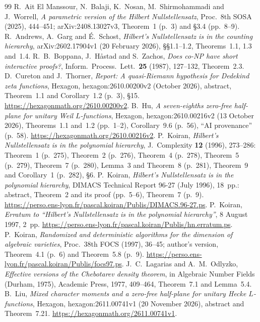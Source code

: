 \documentclass[11pt]{amsart}
\theoremstyle{definition}
\theoremstyle{remark}
\begin{document}
\begin{thebibliography}{99}
 R.~Ait El Manssour, N.~Balaji, K.~Nosan, M.~Shirmohammadi and J.~Worrell, \emph{A parametric version of the Hilbert Nullstellensatz}, Proc.\ 8th SOSA (2025), 444--451; arXiv:2408.13027v3, Theorem~1 (p.~3) and \S3.4 (pp.~8--9).
 R.~Andrews, A.~Garg and \'E.~Schost, \emph{Hilbert's Nullstellensatz is in the counting hierarchy}, arXiv:2602.17904v1 (20 February 2026), \S\S1.1--1.2, Theorems~1.1, 1.3 and~1.4.
 R.~B.~Boppana, J.~H\aa stad and S.~Zachos, \emph{Does co-NP have short interactive proofs?}, Inform.\ Process.\ Lett.\ \textbf{25} (1987), 127--132, Theorem~2.3.
 D.~Cureton and J.~Thorner, \emph{Report: A quasi-Riemann hypothesis for Dedekind zeta functions}, Hexagon, hexagon:2610.00200v2 (October 2026), abstract, Theorem~1.1 and Corollary~1.2 (p.~3), \S15. \url{https://hexagonmath.org/2610.00200v2}.
 B.~Hu, \emph{A seven-eighths zero-free half-plane for unitary Weil $L$-functions}, Hexagon, hexagon:2610.00216v2 (13 October 2026), Theorems~1.1 and~1.2 (pp.~1--2), Corollary~9.6 (p.~56), ``AI provenance'' (p.~58). \url{https://hexagonmath.org/2610.00216v2}.
 P.~Koiran, \emph{Hilbert's Nullstellensatz is in the polynomial hierarchy}, J.~Complexity \textbf{12} (1996), 273--286: Theorem~1 (p.~275), Theorem~2 (p.~276), Theorem~4 (p.~278), Theorem~5 (p.~279), Theorem~7 (p.~280), Lemma~3 and Theorem~8 (p.~281), Theorem~9 and Corollary~1 (p.~282), \S6.
 P.~Koiran, \emph{Hilbert's Nullstellensatz is in the polynomial hierarchy}, DIMACS Technical Report 96-27 (July 1996), 18~pp.: abstract, Theorem~2 and its proof (pp.~5--6), Theorem~7 (p.~9). \url{https://perso.ens-lyon.fr/pascal.koiran/Publis/DIMACS.96-27.ps}.
 P.~Koiran, \emph{Erratum to ``Hilbert's Nullstellensatz is in the polynomial hierarchy''}, 8 August 1997, 2~pp. \url{https://perso.ens-lyon.fr/pascal.koiran/Publis/hn.erratum.ps}.
 P.~Koiran, \emph{Randomized and deterministic algorithms for the dimension of algebraic varieties}, Proc.\ 38th FOCS (1997), 36--45; author's version, Theorem~4.1 (p.~6) and Theorem~5.8 (p.~9). \url{https://perso.ens-lyon.fr/pascal.koiran/Publis/focs97.ps}.
 J.~C.~Lagarias and A.~M.~Odlyzko, \emph{Effective versions of the Chebotarev density theorem}, in Algebraic Number Fields (Durham, 1975), Academic Press, 1977, 409--464, Theorem~7.1 and Lemma~5.4.
 B.~Liu, \emph{Mixed character moments and a zero-free half-plane for unitary Hecke $L$-functions}, Hexagon, hexagon:2611.00741v1 (20 November 2026), abstract and Theorem~7.21. \url{https://hexagonmath.org/2611.00741v1}.

\end{thebibliography}
\end{document}
